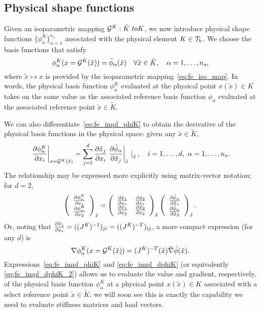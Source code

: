 \subsection{Physical shape functions}
  \label{sec:fe_phy_shape}
Given an isoparametric mapping $\calG^K : \tilde K \ to K$, we now introduce physical shape functions $\{ \phi^K_\alpha \}_{\alpha=1}^{n_s}$ associated with the physical element $K \in \calT_h$.  We choose the basis functions that satisfy
\begin{equation}
  \phi^K_\alpha(x = \calG^K(\tilde x)) = \tilde \phi_\alpha(\tilde x) \quad \forall \tilde x \in \tilde K, \quad \alpha =  1, \dots, n_s,
  \label{eq:fe_impl_phiK}
\end{equation}
where $\tilde x \mapsto x$ is provided by the isoparametric mapping~\eqref{eq:fe_iso_map}. In words, the physical basis function $\phi^K_\alpha$ evaluated at the physical point $x(\tilde x) \in K$ takes on the same value as the associated reference basis function $\phi_\alpha$ evaluated at the associated reference point $\tilde x \in \tilde K$.

We can also differentiate~\eqref{eq:fe_impl_phiK} to obtain the derivative of the physical basis functions in the physical space: given any $\tilde x \in \tilde K$, 
\begin{equation}
  \left. \pp{\phi^K_\alpha}{x_i} \right|_{x = \calG^K(\tilde x)} =
  \sum_{j=1}^{d} \pp{\tilde x_j}{x_i} \left. \pp{\tilde \phi_\alpha}{\tilde x_j} \right|_{\tilde x} \left.  \right|_{\tilde x}, \quad i = 1,\dots,d, \ \alpha = 1,\dots,n_s.
  \label{eq:fe_impl_dphiK}
\end{equation}
The relationship may be expressed more explicitly using matrix-vector notation; for $d = 2$,
\begin{equation*}
  \bmat{c}
  \pp{\phi_\alpha^K}{x_1} \\ \pp{\phi_\alpha^K}{x_2}
  \emat_{\tilde x}
  =
  \bmat{cc}
  \pp{\tilde x_1}{x_1} & \pp{\tilde x_2}{x_1} \\
  \pp{\tilde x_1}{x_2} & \pp{\tilde x_2}{x_2}
  \emat_{\tilde x}
  \bmat{c}
  \pp{\tilde \phi_\alpha}{\tilde x_1} \\ \pp{\tilde \phi_\alpha}{\tilde x_2}
  \emat_{\tilde x}.
\end{equation*}
Or, noting that $\pp{\tilde x_j}{x_i} = ((J^K)^{-1})_{ji} = ((J^K)^{-T})_{ij}$, a more compact expression (for any $d$) is
\begin{equation}
  \nabla \phi_\alpha^K(x = \calG^K(\tilde x)) = (J^K)^{-T}(\tilde x) \tilde \nabla \tilde \phi(\tilde x).
  \label{eq:fe_impl_dphiK_2}
\end{equation}
Expressions~\eqref{eq:fe_impl_phiK} and \eqref{eq:fe_impl_dphiK} (or equivalently \eqref{eq:fe_impl_dphiK_2}) allows us to evaluate the value and gradient, respectively, of the physical basis function $\phi^K_\alpha$ at a physical point $x(\tilde x) \in K$ associated with a select reference point $\tilde x \in \tilde K$; we will soon see this is exactly the capability we need to evaluate stiffness matrices and load vectors.

